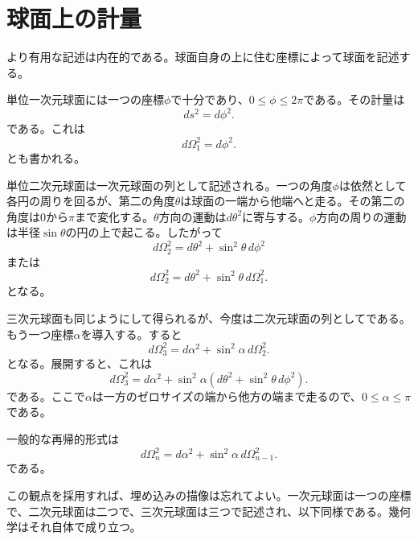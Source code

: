 \section{球面上の計量}

より有用な記述は内在的である。球面自身の上に住む座標によって球面を記述する。

単位一次元球面には一つの座標\(\phi\)で十分であり、\(0\leq \phi \leq 2\pi\)である。その計量は
\begin{equation}
ds^2=d\phi^2.
\end{equation}
である。これは
\begin{equation}
d\Omega_1^2=d\phi^2.
\end{equation}
とも書かれる。

単位二次元球面は一次元球面の列として記述される。一つの角度\(\phi\)は依然として各円の周りを回るが、第二の角度\(\theta\)は球面の一端から他端へと走る。その第二の角度は\(0\)から\(\pi\)まで変化する。\(\theta\)方向の運動は\(d\theta^2\)に寄与する。\(\phi\)方向の周りの運動は半径\(\sin\theta\)の円の上で起こる。したがって
\begin{equation}
d\Omega_2^2=d\theta^2+\sin^2\theta\,d\phi^2
\end{equation}
または
\begin{equation}
d\Omega_2^2=d\theta^2+\sin^2\theta\,d\Omega_1^2.
\end{equation}
となる。

三次元球面も同じようにして得られるが、今度は二次元球面の列としてである。もう一つ座標\(\alpha\)を導入する。すると
\begin{equation}
d\Omega_3^2=d\alpha^2+\sin^2\alpha\,d\Omega_2^2.
\end{equation}
となる。展開すると、これは
\begin{equation}
d\Omega_3^2=d\alpha^2+\sin^2\alpha\left(d\theta^2+\sin^2\theta\,d\phi^2\right).
\end{equation}
である。ここで\(\alpha\)は一方のゼロサイズの端から他方の端まで走るので、\(0\leq \alpha \leq \pi\)である。

一般的な再帰的形式は
\begin{equation}
d\Omega_n^2=d\alpha^2+\sin^2\alpha\,d\Omega_{n-1}^2.
\end{equation}
である。

この観点を採用すれば、埋め込みの描像は忘れてよい。一次元球面は一つの座標で、二次元球面は二つで、三次元球面は三つで記述され、以下同様である。幾何学はそれ自体で成り立つ。

